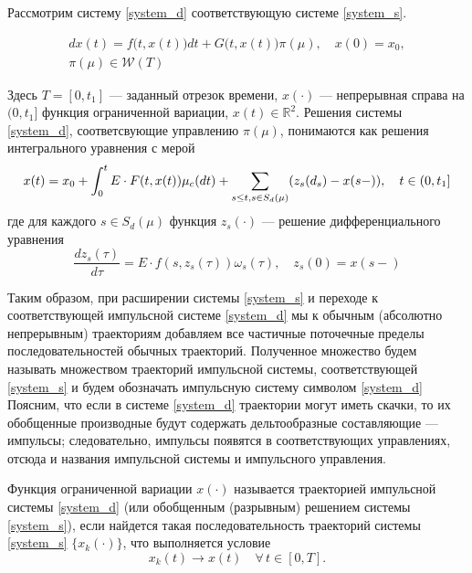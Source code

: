  Рассмотрим систему \eqref{system_d} соответствующую системе
\eqref{system_s}.

\begin{equation}
  \label{system_d}
  \begin{array}{l}
    dx(t)=f\big(t,x(t)\big)dt+G\big(t,x(t)\big)\pi(\mu), \quad
    x(0)=x_0, \\[8pt]
    \pi(\mu) \in \mathcal{W}(T)
  \end{array} 
\end{equation}

Здесь $T=[0,t_1]$ --- заданный отрезок времени, $x(\cdot)$ ---
непрерывная справа на $(0,t_1]$ функция ограниченной вариации, $x(t)
\in \mathbb{R}^2$. Решения системы \eqref{system_d}, соответсвующие
управлению $\pi(\mu)$, понимаются как решения интегрального уравнения
с мерой
\begin{equation*}
  x(t) = x_0  + \int_0^t E\cdot F(t,x(t)) \mu_c(dt) +
  \sum_{s \le t,\\s \in S_d(\mu)} (z_s(d_s) - x(s-)), \quad t \in (0,t_1]
\end{equation*}
где для каждого $s \in S_d(\mu)$ функция $z_s(\cdot)$ --- решение
дифференциального уравнения
\begin{equation*}
  \frac{dz_s(\tau)}{d\tau} = E\cdot f(s,z_s(\tau))\omega_s(\tau), \quad z_s(0)=x(s-)
\end{equation*}

Таким образом, при расширении системы \eqref{system_s} и переходе к
соответствующей импульсной системе \eqref{system_d} мы к обычным
(абсолютно непрерывным) траекториям добавляем все частичные
поточечные пределы последовательностей обычных
траекторий. Полученное множество будем называть множеством
траекторий импульсной системы, соответствующей \eqref{system_s} и будем
обозначать импульсную систему символом \eqref{system_d} Поясним,
что если в системе \eqref{system_d} траектории могут иметь скачки,
то их обобщенные производные будут содержать дельтообразные
составляющие --- импульсы; следовательно, импульсы появятся в
соответствующих управлениях, отсюда и названия импульсной системы и
импульсного управления.


Функция ограниченной вариации $x(\cdot)$ называется траекторией
импульсной системы \eqref{system_d} (или обобщенным (разрывным)
решением системы \eqref{system_s}), если найдется такая последовательность
траекторий системы \eqref{system_s} $\bigl\{x_k(\cdot)\bigr\}$, что выполняется
условие 
\begin{equation*}
  x_k(t)\to x(t) \quad  \forall \, t\in [0,T].
\end{equation*}

